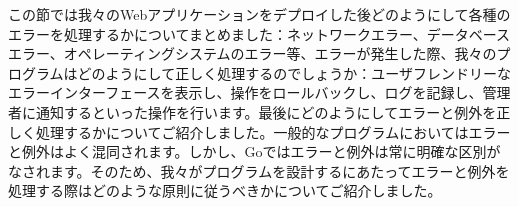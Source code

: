この節では我々のWebアプリケーションをデプロイした後どのようにして各種のエラーを処理するかについてまとめました：ネットワークエラー、データベースエラー、オペレーティングシステムのエラー等、エラーが発生した際、我々のプログラムはどのようにして正しく処理するのでしょうか：ユーザフレンドリーなエラーインターフェースを表示し、操作をロールバックし、ログを記録し、管理者に通知するといった操作を行います。最後にどのようにしてエラーと例外を正しく処理するかについてご紹介しました。一般的なプログラムにおいてはエラーと例外はよく混同されます。しかし、Goではエラーと例外は常に明確な区別がなされます。そのため、我々がプログラムを設計するにあたってエラーと例外を処理する際はどのような原則に従うべきかについてご紹介しました。
